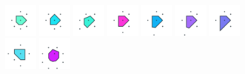 \documentclass[text.tex]{subfiles}
\begin{document}
\begin{figure}[h!]
\includegraphics[width=0.12\textwidth]{img/results/octagon/octagon_120710_(0_1alpha_2)_005.pdf}
\includegraphics[width=0.12\textwidth]{img/results/octagon/octagon_120710_(0_1alpha_2)_006.pdf}
\includegraphics[width=0.12\textwidth]{img/results/octagon/octagon_120710_(0_1alpha_2)_007.pdf}
\includegraphics[width=0.12\textwidth]{img/results/octagon/octagon_120710_(0_1alpha_2)_008.pdf}
\includegraphics[width=0.12\textwidth]{img/results/octagon/octagon_120710_(0_1alpha_2)_009.pdf}
\includegraphics[width=0.12\textwidth]{img/results/octagon/octagon_120710_(0_1alpha_2)_010.pdf}
\includegraphics[width=0.12\textwidth]{img/results/octagon/octagon_120710_(0_1alpha_2)_011.pdf}
\includegraphics[width=0.12\textwidth]{img/results/octagon/octagon_120710_(0_1alpha_2)_012.pdf}
\includegraphics[width=0.12\textwidth]{img/results/octagon/octagon_120710_(0_1alpha_2)_013.pdf}
\end{figure}
\end{document}
